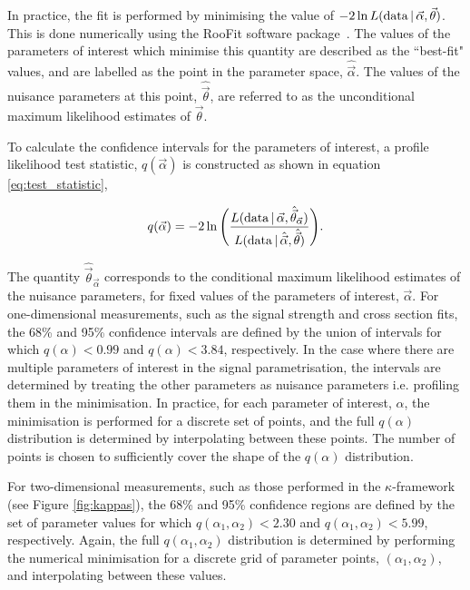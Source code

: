 In practice, the fit is performed by minimising the value of $-2 \ln L({\rm{data}}\,|\,\vec{\alpha},\vec{\theta})$. This is done numerically using the RooFit software package~\cite{Verkerke:2003ir}. The values of the parameters of interest which minimise this quantity are described as the ``best-fit" values, and are labelled as the point in the parameter space, $\hat{\vec{\alpha}}$. The values of the nuisance parameters at this point, $\hat{\vec{\theta}}$, are referred to as the unconditional maximum likelihood estimates of $\vec{\theta}$. 

To calculate the confidence intervals for the parameters of interest, a profile likelihood test statistic, $q(\vec{\alpha})$ is constructed as shown in equation \ref{eq:test_statistic},

\begin{equation}\label{eq:test_statistic}
    q(\vec{\alpha}) = -2 \ln \Bigg( \frac{L({\rm{data}}\,|\,\vec{\alpha},\hat{\vec{\theta}}_{\vec{\alpha}})}{L({\rm{data}}\,|\,\hat{\vec{\alpha}},\hat{\vec{\theta}})} \Bigg).
\end{equation}

\noindent
The quantity $\hat{\vec{\theta}}_{\vec{\alpha}}$ corresponds to the conditional maximum likelihood estimates of the nuisance parameters, for fixed values of the parameters of interest, $\vec{\alpha}$. For one-dimensional measurements, such as the signal strength and cross section fits, the 68\% and 95\% confidence intervals are defined by the union of intervals for which $q(\alpha)<0.99$ and $q(\alpha)<3.84$, respectively. In the case where there are multiple parameters of interest in the signal parametrisation, the intervals are determined by treating the other parameters as nuisance parameters i.e. profiling them in the minimisation. In practice, for each parameter of interest, $\alpha$, the minimisation is performed for a discrete set of points, and the full $q(\alpha)$ distribution is determined by interpolating between these points. The number of points is chosen to sufficiently cover the shape of the $q(\alpha)$ distribution.

For two-dimensional measurements, such as those performed in the $\kappa$-framework (see Figure \ref{fig:kappas}), the 68\% and 95\% confidence regions are defined by the set of parameter values for which $q(\alpha_1,\alpha_2)<2.30$ and $q(\alpha_1,\alpha_2)<5.99$, respectively. Again, the full $q(\alpha_1,\alpha_2)$ distribution is determined by performing the numerical minimisation for a discrete grid of parameter points, $(\alpha_1,\alpha_2)$, and interpolating between these values.

